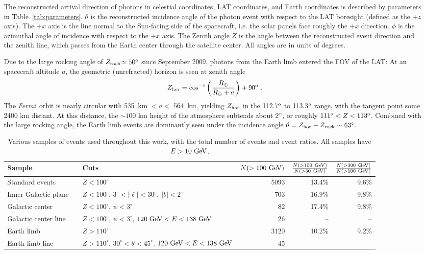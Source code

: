 \documentclass[aps,twocolumn,prd,superscriptaddress,showpacs,nofootinbib,fixfloat]{revtex4}
\newcommand{\be}{\begin{equation}}
\newcommand{\ee}{\end{equation}}
\newcommand{\Fermi}{{\slshape Fermi}}
\newcommand{\GeV}{{\rm ~GeV}}
\newcommand{\degree}{^{\rm o}}
\newcommand{\zrock}{$Z_{\rm rock}$}
\begin{document}
The reconstructed arrival direction of photons in celestial coordinates, LAT
coordinates, and Earth coordinates is described by parameters in 
Table~\ref{tab:parameters}.  $\theta$ is the reconstructed incidence angle of
the photon event with respect to the LAT boresight (defined as the $+z$ axis).
The $+x$ axis is the line normal to the Sun-facing side of the spacecraft,
i.e. the solar panels face roughly the $+x$ direction.   $\phi$ is the
azimuthal angle of incidence with respect to the $+x$ axis.
The Zenith angle $Z$ is the angle between the
reconstructed event direction and the zenith line, which passes from the
Earth center through the satellite center.   All angles are in units of
degrees.

Due to the large rocking angle of \zrock$\simeq50\degree$
since September 2009, photons from the Earth limb 
entered the FOV of the LAT:
%
At an spacecraft altitude $a$, the geometric (unrefracted) horizon is seen at zenith angle \be
Z_{\rm hor} = \cos^{-1}\left(\frac{R_\oplus}{R_\oplus+a}\right)+90\degree\;. \ee
The \Fermi\ orbit is nearly circular with 535~km $< a <$ 564~km, yielding
$Z_{\rm hor}$ in the 112.7$\degree$ to 113.3$\degree$ range, with the tangent
point some 2400 km distant.  At this distance, the $\sim 100$ km height of the
atmosphere subtends about $2\degree$, or roughly $111\degree < Z <
113\degree$. Combined with the large rocking angle, the Earth limb events are
dominantly seen under the incidence angle $\theta=Z_{\rm hor}-Z_{\rm rock}\sim 63^\circ$.
\medskip

\begin{table}
  \begin{tabular}{lllrrr}
    \hline
    Sample &&Cuts & $N(>100\GeV)$ & $\frac{N(>100\GeV)}{N(>30\GeV)}$ & $\frac{N(>300\GeV)}{N(>100\GeV)}$\\
    \hline
    Standard events      &  & $Z<100^\circ$ & 5093 & 13.4\% & 9.6\% \\
    Inner Galactic plane &  & $Z<100^\circ$, $3^\circ < |\ell| < 30^\circ,\ |b|<2^\circ$     & 703 & 16.9\% & 9.8\% \\
    Galactic center      &  & $Z<100^\circ$, $\psi<3^\circ$ & 82 & 17.4\% & 9.8\% \\
    Galactic center line &  & $Z<100^\circ$, $\psi<3^\circ$, $120\GeV<E<138\GeV$             & 26 & -- & -- \\
    Earth limb           &  & $Z>110^\circ$ & 3120 & 10.2\% & 9.2\% \\
    Earth limb line      &  & $Z>110^\circ$, $30^\circ<\theta<45^\circ$, $120\GeV<E<138\GeV$ & 45 & -- & -- \\ 
    \hline
  \end{tabular}
  \caption{Various samples of events used throughout this work, with 
    the total number of events and event ratios.
    All samples have $E>10\GeV$.}
  \label{tab:regions}
\end{table}
\end{document}
